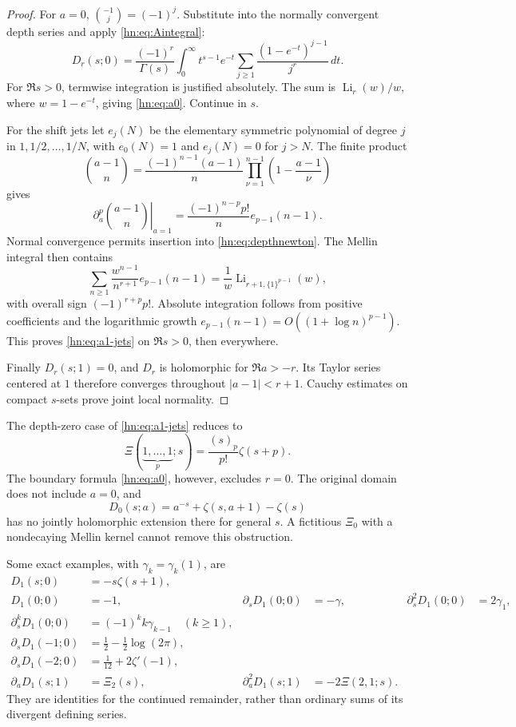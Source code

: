\documentclass[11pt,a4paper]{article}
\numberwithin{equation}{section}
\theoremstyle{definition}
\theoremstyle{remark}
\begin{document}
\begin{proof}
For $a=0$, $\binom{-1}{j}=(-1)^j$. Substitute into the normally
convergent depth series and apply \eqref{hn:eq:Aintegral}:
\[
 D_r(s;0)=\frac{(-1)^r}{\Gamma(s)}\int_0^\infty
     t^{s-1}e^{-t}\sum_{j\ge1}\frac{(1-e^{-t})^{j-1}}{j^r}\,dt.
\]
For $\Re s>0$, termwise integration is justified absolutely.
The sum is $\operatorname{Li}_r(w)/w$, where $w=1-e^{-t}$,
giving \eqref{hn:eq:a0}. Continue in $s$.

For the shift jets let $e_j(N)$ be the elementary symmetric
polynomial of degree $j$ in $1,1/2,\ldots,1/N$, with $e_0(N)=1$
and $e_j(N)=0$ for $j>N$. The finite product
\[
 \binom{a-1}{n}=\frac{(-1)^{n-1}(a-1)}n
          \prod_{\nu=1}^{n-1}\left(1-\frac{a-1}{\nu}\right)
\]
gives
\[
 \left.\partial_a^p\binom{a-1}{n}\right|_{a=1}
      =\frac{(-1)^{n-p}p!}{n}e_{p-1}(n-1).
\]
Normal convergence permits insertion into
\eqref{hn:eq:depthnewton}. The Mellin integral then contains
\[
 \sum_{n\ge1}\frac{w^{n-1}}{n^{r+1}}e_{p-1}(n-1)
 =\frac1w\operatorname{Li}_{r+1,\{1\}^{p-1}}(w),
\]
with overall sign $(-1)^{r+p}p!$. Absolute integration follows
from positive coefficients and the logarithmic growth
$e_{p-1}(n-1)=O((1+\log n)^{p-1})$.
This proves \eqref{hn:eq:a1-jets} on $\Re s>0$, then everywhere.

Finally $D_r(s;1)=0$, and $D_r$ is holomorphic for $\Re a>-r$.
Its Taylor series centered at $1$ therefore converges throughout
$|a-1|<r+1$. Cauchy estimates on compact $s$-sets prove joint
local normality.
\end{proof}

The depth-zero case of \eqref{hn:eq:a1-jets} reduces to
\[
 \Xi(\underbrace{1,\ldots,1}_{p};s)
        =\frac{(s)_p}{p!}\zeta(s+p).
\]
The boundary formula \eqref{hn:eq:a0}, however, excludes $r=0$.
The original domain does not include $a=0$, and
\[
 D_0(s;a)=a^{-s}+\zeta(s,a+1)-\zeta(s)
\]
has no jointly holomorphic extension there for general $s$.
A fictitious $\Xi_0$ with a nondecaying Mellin kernel cannot
remove this obstruction.

Some exact examples, with $\gamma_k=\gamma_k(1)$, are
\begin{align*}
 D_1(s;0)&=-s\zeta(s+1),\\
 D_1(0;0)&=-1,&
 \partial_sD_1(0;0)&=-\gamma,&
 \partial_s^2D_1(0;0)&=2\gamma_1,\\
 \partial_s^kD_1(0;0)&=(-1)^k k\gamma_{k-1}\quad(k\ge1),\\
 \partial_sD_1(-1;0)&=\frac12-\frac12\log(2\pi),\\
 \partial_sD_1(-2;0)&=\frac1{12}+2\zeta'(-1),\\
 \partial_aD_1(s;1)&=\Xi_2(s),&
 \partial_a^2D_1(s;1)&=-2\Xi(2,1;s).
\end{align*}
They are identities for the continued remainder, rather than
ordinary sums of its divergent defining series.
\end{document}
